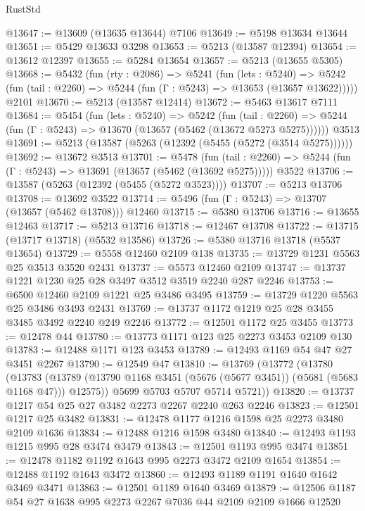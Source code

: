 \begin{lexlean}{RustStd}
\begin{coremodule}
@13647 := @13609 (@13635 @13644) @7106
@13649 := @5198 @13634 @13644
@13651 := @5429 @13633 @3298
@13653 := @5213 (@13587 @12394)
@13654 := @13612 @12397
@13655 := @5284 @13654
@13657 := @5213 (@13655 @5305)
@13668 := @5432
    (fun (rty : @2086) =>
    @5241
      (fun (lets : @5240) =>
      @5242 (fun (tail : @2260) => @5244 (fun (Γ : @5243) => @13653 (@13657 @13622)))))
    @2101
@13670 := @5213 (@13587 @12414)
@13672 := @5463 @13617 @7111
@13684 := @5454
    (fun (lets : @5240) =>
    @5242
      (fun (tail : @2260) =>
      @5244 (fun (Γ : @5243) => @13670 (@13657 (@5462 (@13672 @5273 @5275))))))
    @3513
@13691 := @5213 (@13587 (@5263 (@12392 (@5455 (@5272 (@3514 @5275))))))
@13692 := @13672 @3513
@13701 := @5478
    (fun (tail : @2260) => @5244 (fun (Γ : @5243) => @13691 (@13657 (@5462 (@13692 @5275)))))
    @3522
@13706 := @13587 (@5263 (@12392 (@5455 (@5272 @3523))))
@13707 := @5213 @13706
@13708 := @13692 @3522
@13714 := @5496 (fun (Γ : @5243) => @13707 (@13657 (@5462 @13708))) @12460
@13715 := @5380 @13706
@13716 := @13655 @12463
@13717 := @5213 @13716
@13718 := @12467 @13708
@13722 := @13715 (@13717 @13718) (@5532 @13586)
@13726 := @5380 @13716 @13718 (@5537 @13654)
@13729 := @5558 @12460 @2109 @138
@13735 := @13729 @1231 @5563 @25 @3513 @3520 @2431
@13737 := @5573 @12460 @2109
@13747 := @13737 @1221 @1230 @25 @28 @3497 @3512 @3519 @2240 @287 @2246
@13753 := @6500 @12460 @2109 @1221 @25 @3486 @3495
@13759 := @13729 @1220 @5563 @25 @3486 @3493 @2431
@13769 := @13737 @1172 @1219 @25 @28 @3455 @3485 @3492 @2240 @249 @2246
@13772 := @12501 @1172 @25 @3455
@13773 := @12478 @44
@13780 := @13773 @1171 @123 @25 @2273 @3453 @2109 @130
@13783 := @12488 @1171 @123 @3453
@13789 := @12493 @1169 @54 @47 @27 @3451 @2267
@13790 := @12549 @47
@13810 := @13769
    (@13772
      (@13780
        (@13783
          (@13789 (@13790 @1168 @3451 (@5676 (@5677 @3451)) (@5681 (@5683 @1168 @47))) @12575))
        @5699
        @5703
        @5707
        @5714
        @5721))
@13820 := @13737 @1217 @54 @25 @27 @3482 @2273 @2267 @2240 @263 @2246
@13823 := @12501 @1217 @25 @3482
@13831 := @12478 @1177 @1216 @1598 @25 @2273 @3480 @2109 @1636
@13834 := @12488 @1216 @1598 @3480
@13840 := @12493 @1193 @1215 @995 @28 @3474 @3479
@13843 := @12501 @1193 @995 @3474
@13851 := @12478 @1182 @1192 @1643 @995 @2273 @3472 @2109 @1654
@13854 := @12488 @1192 @1643 @3472
@13860 := @12493 @1189 @1191 @1640 @1642 @3469 @3471
@13863 := @12501 @1189 @1640 @3469
@13879 := @12506
    @1187
    @54
    @27
    @1638
    @995
    @2273
    @2267
    @7036
    @44
    @2109
    @2109
    @1666
    @12520

\end{coremodule}
\end{lexlean}
